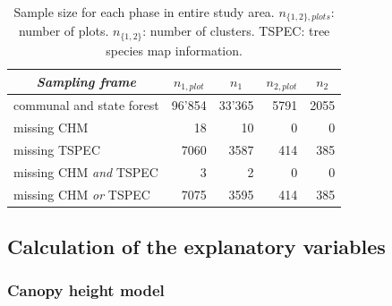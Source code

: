 \documentclass[remotesensing,article,submit,moreauthors,pdftex,10pt,a4paper]{mdpi}
\begin{document}
\begin{table}[H]
	\begin{center}
		\caption{Sample size for each phase in entire study area. $n_{\{1,2\},plots}$: number of plots. $n_{\{1,2\}}$: number of clusters. TSPEC: tree species map information.}
		\vspace{0.2cm}
		\label{tab:ssize}
		{\small %
			\begin{tabular}{l|r|r|r|r}
				\hline
				\multicolumn{1}{c|}{\textit{Sampling frame}} & \multicolumn{1}{c|}{\textbf{$n_{1,plot}$}}  & \multicolumn{1}{c|}{\textbf{$n_1$}}  & \multicolumn{1}{c|}{\textbf{$n_{2,plot}$}}  & \multicolumn{1}{c}{\textbf{$n_2$}} \\ %
				\hline \hline
				communal and state forest & 96'854 & 33'365 & 5791 & 2055\\
				\hspace{5mm} \footnotesize missing CHM & \footnotesize 18 & \footnotesize 10 & \footnotesize 0 & \footnotesize 0\\ %
				\hspace{5mm} \footnotesize missing TSPEC & \footnotesize 7060  & \footnotesize 3587 & \footnotesize 414 & \footnotesize 385\\ %
				\hspace{5mm} \footnotesize missing CHM \textit{and} TSPEC & \footnotesize 3 & \footnotesize 2 & \footnotesize 0 & \footnotesize 0\\ %
				\hspace{5mm} \footnotesize missing CHM \textit{or} TSPEC & \footnotesize 7075 & \footnotesize 3595 & \footnotesize 414 & \footnotesize 385\\ %
				\hline \hline
			\end{tabular}
		} %
	\end{center}
\end{table}


\subsection{Calculation of the explanatory variables}
\label{sec:expvarcalc}

\subsubsection{Canopy height model}
\end{document}
